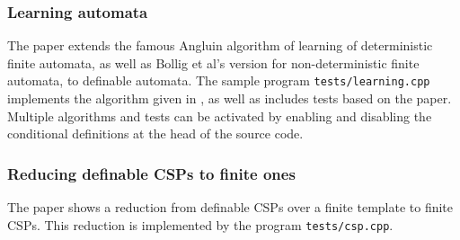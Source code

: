 \subsubsection{Learning automata}

The paper \cite{learningnominal} extends the famous Angluin algorithm of learning
of deterministic finite automata, as well as Bollig et al's version for non-deterministic
finite automata, to definable automata. The sample program {\tt tests/learning.cpp}
implements the algorithm given in \cite{learningnominal}, as well as includes tests
based on the paper. Multiple algorithms and tests can be activated by enabling and
disabling the conditional definitions at the head of the source code.

\subsubsection{Reducing definable CSPs to finite ones}

The paper \cite{infcsp} shows a reduction from definable CSPs over a finite template
to finite CSPs. This reduction is implemented by the program {\tt tests/csp.cpp}.
